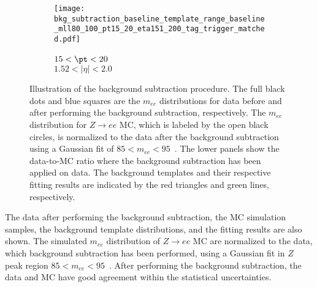 \begin{figure}[htb]
\begin{subfigure}[b]{0.32\textwidth}
    \end{subfigure}
    \begin{subfigure}[b]{0.32\textwidth}
        \begin{center}
            \texttt{[image: bkg\_subtraction\_baseline\_template\_range\_baseline\_mll80\_100\_pt15\_20\_eta151\_200\_tag\_trigger\_matched.pdf]}
            \caption{$15 < \pt < 20$~{\GeV}\\$1.52<|\eta|<2.0$}
        \end{center}
    \end{subfigure}
    \caption{Illustration of the background subtraction procedure.
    The full black dots and blue squares are the $m_{ee}$ distributions for data before and after performing the background subtraction, respectively.
    The $m_{ee}$ distribution for $Z \to ee$ MC, which is labeled by the open black circles, is normalized to the data after the background subtraction using a Gaussian fit of $85 < m_{ee} < 95$~{\GeV}.
    The lower panels show the data-to-MC ratio where the background subtraction has been applied on data.
    The background templates and their respective fitting results are indicated by the red triangles and green lines, respectively.
    }
    \label{fig:app_RLE_bkg_estimations}
\end{figure}
%
The data after performing the background subtraction, the MC simulation samples, the background template distributions, and the fitting results are also shown.
The simulated $m_{ee}$ distribution of $Z \to ee$ MC are normalized to the data, which background subtraction has been performed, using a Gaussian fit in $Z$ peak region $85 < m_{ee} < 95$~{\GeV}.
After performing the background subtraction, the data and MC have good agreement within the statistical uncertainties.

